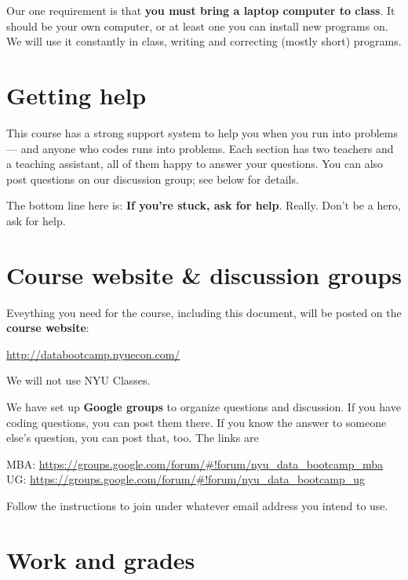 \documentclass[11pt]{article}
\begin{document}
Our one requirement is that {\bf you must bring a laptop computer to class\/}.
It should be your own computer, or at least one you can install new programs on.
We will use it constantly in class, writing and correcting (mostly short) programs.


\section*{Getting help}



This course has a strong support system to help you when you run into problems ---
and anyone who codes runs into problems. 
Each section has two teachers and a teaching assistant, all of them happy to answer your questions.  
You  can also post questions on our discussion group; see below for details.  

The bottom line here is:  {\bf If you're stuck, ask for help\/}.
Really.  Don't be a hero, ask for help.  



\section*{Course website \& discussion groups}

Eveything you need for the course, including this document, will be posted on
the {\bf course website\/}:
%
\vspace{-0.15in}
\begin{center}
\url{http://databootcamp.nyuecon.com/} 
\end{center}
\vspace{-0.15in}
%
We will not use NYU Classes.

We have set up {\bf Google groups\/} to organize questions and discussion.
If you have coding questions, you can post them there.
If you know the answer to someone else's question, you can post that, too.
The links are
%
\vspace{-0.1in}
\begin{center}
MBA:  \url{https://groups.google.com/forum/#!forum/nyu_data_bootcamp_mba} \\
UG:   \url{https://groups.google.com/forum/#!forum/nyu_data_bootcamp_ug}
\end{center}
\vspace{-0.1in}
%
Follow the instructions to join under whatever email address you intend to use.




\section*{Work and grades}
\end{document}
